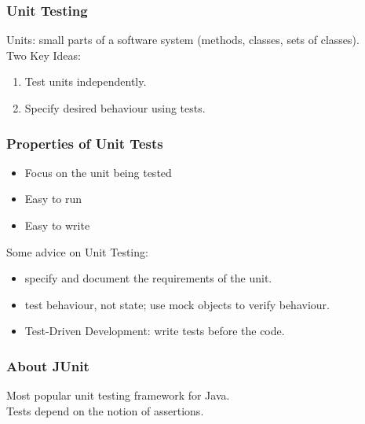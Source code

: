 \begin{frame}
\frametitle{Unit Testing}

\begin{changemargin}{1cm}

\Large
Units: small parts of a software system (methods, classes, sets of classes).\\[1em]

Two Key Ideas:
\begin{enumerate}
\item Test units independently.
\item Specify desired behaviour using tests.
\end{enumerate}

\end{changemargin}

\end{frame}

\begin{frame}
\frametitle{Properties of Unit Tests}
\begin{changemargin}{1cm}
\begin{itemize}
	\item Focus on the unit being tested 
	\item Easy to run 
	\item Easy to write 
\end{itemize}

Some advice on Unit Testing:

\begin{itemize}
\item specify and document the requirements of the unit.
\item test behaviour, not state; use mock objects to verify behaviour.
\item Test-Driven Development: write tests before the code.
\end{itemize}

\end{changemargin}
\end{frame}


\begin{frame}
\frametitle{About JUnit}

\begin{changemargin}{1cm}
\large

Most popular unit testing framework for Java.\\[1em]

Tests depend on the notion of \alert{assertions}.

\end{changemargin}

\end{frame}

